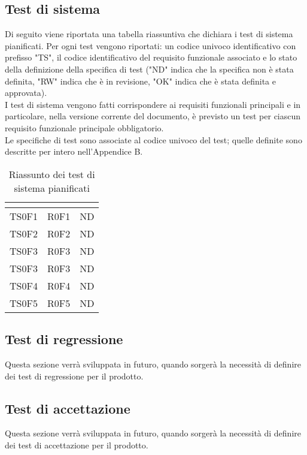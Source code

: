 \subsection{Test di sistema}
Di seguito viene riportata una tabella riassuntiva che dichiara i test di sistema pianificati. Per ogni test vengono riportati: un codice univoco identificativo con prefisso "TS", il codice identificativo del requisito funzionale associato e lo stato della definizione della specifica di test ("ND" indica che la specifica non è stata definita, "RW" indica che è in revisione, "OK" indica che è stata definita e approvata). \\
I test di sistema vengono fatti corrispondere ai requisiti funzionali principali e in particolare, nella versione corrente del documento, è previsto un test per ciascun requisito funzionale principale obbligatorio. \\
Le specifiche di test sono associate al codice univoco del test; quelle definite sono descritte per intero nell'Appendice B.

\renewcommand{\arraystretch}{1.5}
\begin{table}[H]
	\begin{center}
		\begin{tabular}{|c|c|c|}
			\hline
			\rowcolor{title_row}
			\textbf{\color{title_text}{Id Test}} & \textbf{\color{title_text}{Id Requisito}} & \textbf{\color{title_text}{Stato specifica}} \\
			\hline
			{TS0F1} & {R0F1} & {ND}\\
			\hline
			{TS0F2} & {R0F2} & {ND}\\
			\hline
			{TS0F3} & {R0F3} & {ND}\\
			\hline
			{TS0F3} & {R0F3} & {ND}\\
			\hline
			{TS0F4} & {R0F4} & {ND}\\
			\hline
			{TS0F5} & {R0F5} & {ND}\\
			\hline
		\end{tabular}
		\caption{Riassunto dei test di sistema pianificati}
		\label{tabella:riassunto ts}
\end{center}
\end{table}
\renewcommand{\arraystretch}{1}
\subsection{Test di regressione}
Questa sezione verrà sviluppata in futuro, quando sorgerà la necessità di definire dei test di regressione per il prodotto.
\subsection{Test di accettazione}
Questa sezione verrà sviluppata in futuro, quando sorgerà la necessità di definire dei test di accettazione per il prodotto.
\pagebreak